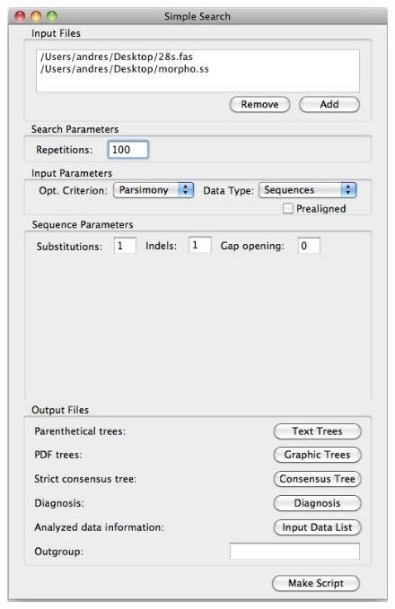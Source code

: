 \begin{figure}
\centering
\begin{minipage}[c]{0.45\textwidth}
\includegraphics[width=\textwidth]{doc/figures/simplesearch_window_filled.jpg}
\end{minipage}
\,
\begin{minipage}[c]{0.52\textwidth}

\end{minipage}
\end{figure}
